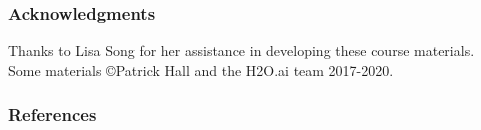 \documentclass[11pt,aspectratio=169,hyperref={colorlinks}]{beamer}
\begin{document}
\begin{frame}[t]
	
	\frametitle{Acknowledgments}		
	
	Thanks to Lisa Song for her assistance in developing these course materials.\\
	\vspace{10pt}
	Some materials \copyright\hspace{1pt}Patrick Hall and the H2O.ai team 2017-2020. 
	
	
	
\end{frame}
		

	\begin{frame}[t, allowframebreaks]
	
		\frametitle{References}	
		
		\printbibliography
		
	\end{frame}
\end{document}
